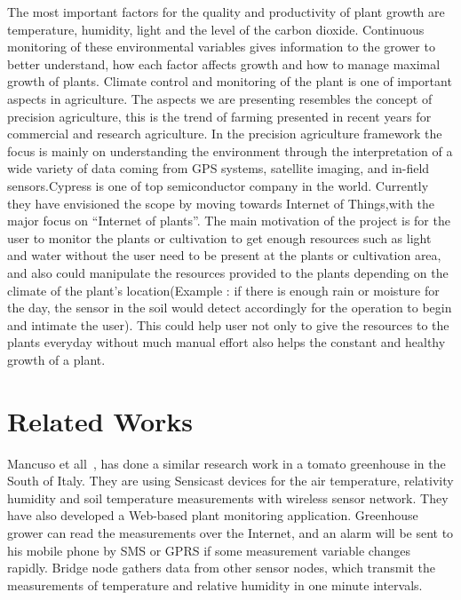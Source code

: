 \documentclass[10pt]{article}
\begin{document}
The most important factors for the quality and productivity of plant growth are temperature, humidity, light and the level of the carbon dioxide. 
Continuous monitoring of these environmental variables gives information to the grower to better understand, how each factor affects growth and how to manage maximal growth of plants. 
Climate control and monitoring of the plant is one of important aspects in agriculture. 
The aspects we are presenting resembles the concept of precision agriculture, this is the trend of farming presented in recent years for commercial and research agriculture\cite{ref005}. 
In the precision agriculture framework the focus is mainly on understanding the environment through the interpretation of a wide variety of data coming from GPS systems, satellite imaging, and in-field sensors.Cypress is one of top semiconductor company in the world. Currently they have envisioned the scope by moving towards Internet of Things,with the major focus on ``Internet of plants''.  
The main motivation of the project is for the user to monitor the plants or cultivation to get enough resources such as light and water without the user need to be present at the plants or cultivation area, and also could manipulate the resources provided to the plants depending on the climate of the plant's location(Example : if there is enough rain or moisture for the day, the sensor in the soil would detect accordingly for the operation to begin and intimate the user).
This could help user not only to give the resources to the plants everyday without much manual effort also helps the constant and healthy growth of a plant.


\section*{Related Works}




Mancuso et all~\cite{ref003}, has done a similar research work in a tomato greenhouse in the South of Italy. 
They are using Sensicast devices for the air temperature, relativity humidity and soil temperature measurements with wireless sensor network. 
They have also developed a Web-based plant monitoring application. 
Greenhouse grower can read the measurements over the Internet, and an alarm will be sent to his mobile phone by SMS or GPRS if some measurement variable changes rapidly. 
Bridge node gathers data from other sensor nodes, which transmit the measurements of temperature and relative humidity in one minute intervals. 
\end{document}
